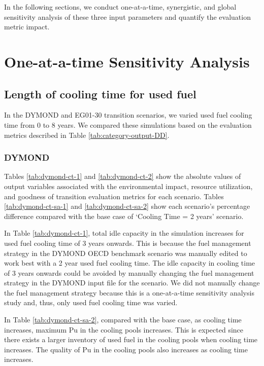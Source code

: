 In the following sections, 
we conduct one-at-a-time, synergistic, and global
sensitivity analysis of these three input parameters and 
quantify the evaluation metric impact.  

\section{One-at-a-time Sensitivity Analysis}
\label{sec:oat}

\subsection{Length of cooling time for used fuel}
In the DYMOND and \Cyclus EG01-30 transition scenarios, 
we varied used fuel cooling time from 0 to 8 years. 
We compared these simulations based on the evaluation 
metrics described in Table \ref{tab:category-output-DD}.

\subsubsection{\textbf{DYMOND}}
Tables \ref{tab:dymond-ct-1} and \ref{tab:dymond-ct-2} show 
the absolute values of 
output variables associated with the environmental impact, 
resource utilization, and goodness of transition evaluation 
metrics for each scenario. 
Tables \ref{tab:dymond-ct-sa-1} and \ref{tab:dymond-ct-sa-2} 
show each scenario's percentage 
difference compared with the base case of `Cooling Time = 2 years'
scenario.

In Table \ref{tab:dymond-ct-1}, total idle capacity 
in the simulation increases for used fuel cooling time of 3 years 
onwards. 
This is because the fuel management strategy in the 
DYMOND OECD benchmark scenario was 
manually edited to work best with a 2 year used fuel cooling time.
The idle capacity in cooling time of 3 years onwards could be 
avoided by manually changing the fuel management strategy
in the DYMOND input file for the scenario. 
We did not manually change the fuel management strategy
because this is a one-at-a-time sensitivity analysis study 
and, thus, only used fuel cooling time was varied. 

In Table \ref{tab:dymond-ct-sa-2}, compared with the base case, 
as cooling time increases, maximum Pu in the cooling pools increases.
This is expected since there exists a larger inventory of used fuel 
in the cooling pools when cooling time increases. 
The quality of Pu in the cooling pools also increases as cooling time 
increases. 

